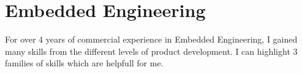 \section{Embedded Engineering}

For over 4 years of commercial experience in Embedded Engineering,
I gained many skills from the different levels of product development. I can
highlight 3 families of skills which are helpfull for me.







